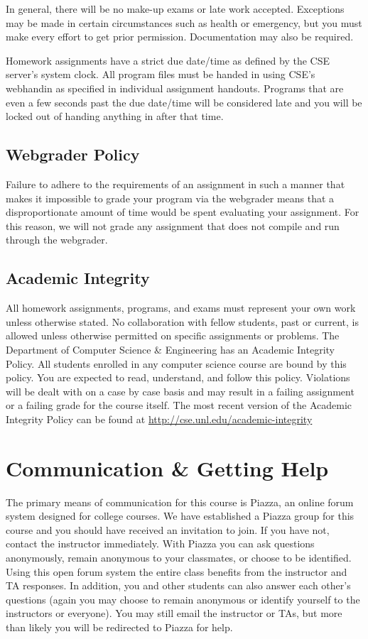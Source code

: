 \documentclass[12pt]{scrartcl}
\begin{document}
In general, there will be no make-up exams or late work
accepted.  Exceptions may be made in certain circumstances 
such as health or emergency, but you must make every effort 
to get prior permission.  Documentation may also be required.

Homework assignments have a strict due date/time as defined by
the CSE server's system clock.  All program files must be handed
in using CSE's webhandin as specified in individual assignment
handouts.  Programs that are even a few seconds past the due 
date/time will be considered late and you will be locked out
of handing anything in after that time.  

\subsection{Webgrader Policy}

Failure to adhere to the requirements of an assignment in such 
a manner that makes it impossible to grade your program via 
the webgrader means that a disproportionate amount of time 
would be spent evaluating your assignment.  For this reason, 
we will not grade any assignment that does not compile and 
run through the webgrader.  

\subsection{Academic Integrity}

All homework assignments, programs, and exams must represent
your own work unless otherwise stated.  No collaboration with 
fellow students, past or current, is allowed unless otherwise 
permitted on specific assignments or problems.  The Department of
Computer Science \& Engineering has an Academic Integrity Policy.  
All students enrolled in any computer science course are bound 
by this policy.  You are expected to read, understand, and follow 
this policy.  Violations will be dealt with on a case by case 
basis and may result in a failing assignment or a failing grade 
for the course itself.  The most recent version of the Academic 
Integrity Policy can be found at \url{http://cse.unl.edu/academic-integrity}

\section{Communication \& Getting Help}

The primary means of communication for this course is Piazza, an online
forum system designed for college courses.  We have established a Piazza 
group for this course and you should have received an invitation to join.
If you have not, contact the instructor immediately.  With Piazza you 
can ask questions anonymously, remain anonymous to your classmates, or 
choose to be identified.  Using this open forum system the entire class 
benefits from the instructor and TA responses.  In addition, you and 
other students can also answer each other's questions (again you may
choose to remain anonymous or identify yourself to the instructors or
everyone).  You may still email the instructor or TAs, but more than 
likely you will be redirected to Piazza for help.
\end{document}
